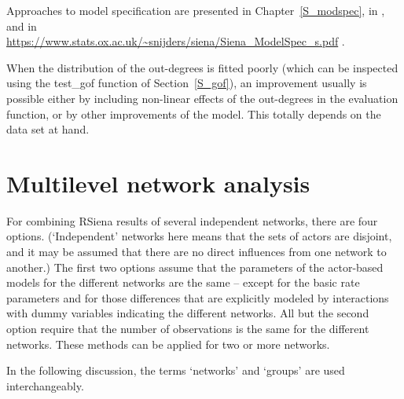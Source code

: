 \documentclass[a4paper,fleqn,11pt]{article}
\newcommand{\+}{\, + \,}
\newcommand{\RS}{{\sf \textsf{RSiena} }}
\begin{document}
Approaches to model specification are presented in Chapter~\ref{S_modspec},
in \citet*{SnijdersEA10b}, and in \\
\url{https://www.stats.ox.ac.uk/~snijders/siena/Siena_ModelSpec_s.pdf} .

When the distribution of the out-degrees is fitted poorly
(which can be inspected using the \textsf{test\_gof} function
of Section~\ref{S_gof}), an improvement
usually is possible either by including non-linear effects of the
out-degrees in the evaluation function, or by other improvements of the model.
This totally depends on the data set at hand.


\newpage
\section{Multilevel network analysis}
\label{S_mulev}

For combining \RS results of several independent networks,
there are four options.
(`Independent'  networks here means that the sets of actors are
disjoint, and it may be assumed that there are no direct influences
from one network to another.)
The first two options assume that the parameters
of the actor-based models for the different
networks are the same -- except
for the basic rate parameters and for
those differences that are explicitly modeled by interactions
with dummy variables indicating the different networks.
All but the second option require that the number of observations
is the same for the different networks.
These methods can be applied for two or more networks.
\medskip

In the following discussion,
the terms `networks' and `groups' are used interchangeably.
\end{document}
